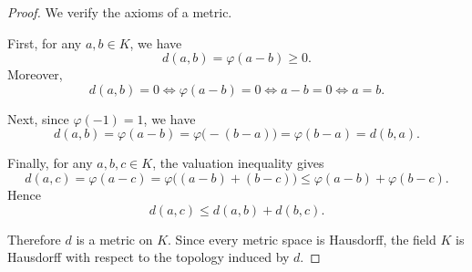 \begin{proof}
    We verify the axioms of a metric.

    First, for any \(a,b\in K\), we have
    \[
        d(a,b)=\varphi(a-b)\geq 0.
    \]
    Moreover,
    \[
        d(a,b)=0
        \Longleftrightarrow
        \varphi(a-b)=0
        \Longleftrightarrow
        a-b=0
        \Longleftrightarrow
        a=b.
    \]

    Next, since \(\varphi(-1)=1\), we have
    \[
        d(a,b)=\varphi(a-b)
        =
        \varphi\bigl(-(b-a)\bigr)
        =
        \varphi(b-a)
        =
        d(b,a).
    \]

    Finally, for any \(a,b,c\in K\), the valuation inequality gives
    \[
        d(a,c)
        =
        \varphi(a-c)
        =
        \varphi\bigl((a-b)+(b-c)\bigr)
        \leq
        \varphi(a-b)+\varphi(b-c).
    \]
    Hence
    \[
        d(a,c)\leq d(a,b)+d(b,c).
    \]

    Therefore \(d\) is a metric on \(K\). Since every metric space is Hausdorff,
    the field \(K\) is Hausdorff with respect to the topology induced by \(d\).
\end{proof}

